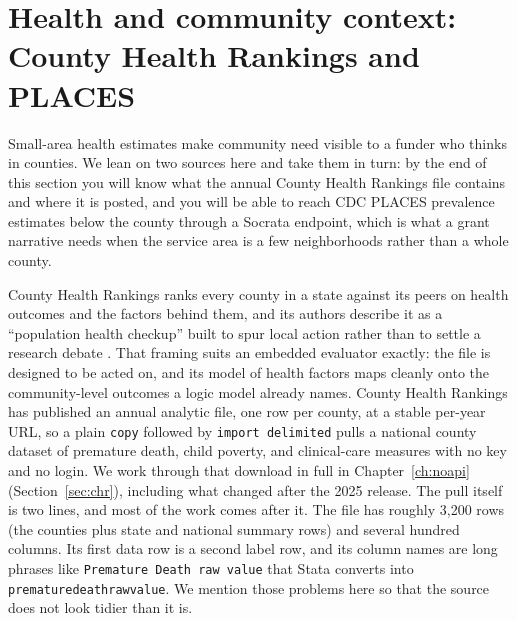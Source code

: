 \section{Health and community context: County Health Rankings and PLACES}
Small-area health estimates make community need visible to a funder who thinks in counties. We lean on two sources here and take them in turn: by the end of this section you will know what the annual County Health Rankings file contains and where it is posted, and you will be able to reach CDC PLACES prevalence estimates below the county through a Socrata endpoint, which is what a grant narrative needs when the service area is a few neighborhoods rather than a whole county.

County Health Rankings ranks every county in a state against its peers on health outcomes and the factors behind them, and its authors describe it as a \enquote{population health checkup} built to spur local action rather than to settle a research debate \parencite{remington2015rankings}. That framing suits an embedded evaluator exactly: the file is designed to be acted on, and its model of health factors maps cleanly onto the community-level outcomes a logic model already names. County Health Rankings has published an annual analytic file, one row per county, at a stable per-year URL, so a plain \texttt{copy} followed by \texttt{import delimited} pulls a national county dataset of premature death, child poverty, and clinical-care measures with no key and no login. We work through that download in full in Chapter~\ref{ch:noapi} (Section~\ref{sec:chr}), including what changed after the 2025 release. The pull itself is two lines, and most of the work comes after it. The file has roughly 3{,}200 rows (the counties plus state and national summary rows) and several hundred columns. Its first data row is a second label row, and its column names are long phrases like \texttt{Premature Death raw value} that Stata converts into \texttt{prematuredeathrawvalue}. We mention those problems here so that the source does not look tidier than it is.

